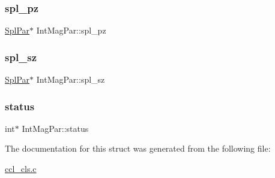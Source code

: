 \mbox{\label{struct_int_mag_par_a9711181f7691f7270f82075dd3e383a1}} 
\subsubsection{\texorpdfstring{spl\+\_\+pz}{spl\_pz}}
{\footnotesize\ttfamily \mbox{\hyperlink{struct_spl_par}{Spl\+Par}}$\ast$ Int\+Mag\+Par\+::spl\+\_\+pz}

\mbox{\label{struct_int_mag_par_a18d0a9ebe5e5ed4fbb945e52ef5c7be7}} 
\subsubsection{\texorpdfstring{spl\+\_\+sz}{spl\_sz}}
{\footnotesize\ttfamily \mbox{\hyperlink{struct_spl_par}{Spl\+Par}}$\ast$ Int\+Mag\+Par\+::spl\+\_\+sz}

\mbox{\label{struct_int_mag_par_a95e214626b6a1bc822ede29ce1b8743d}} 
\subsubsection{\texorpdfstring{status}{status}}
{\footnotesize\ttfamily int$\ast$ Int\+Mag\+Par\+::status}



The documentation for this struct was generated from the following file\+:\begin{DoxyCompactItemize}
\item 
\mbox{\hyperlink{ccl__cls_8c}{ccl\+\_\+cls.\+c}}\end{DoxyCompactItemize}
